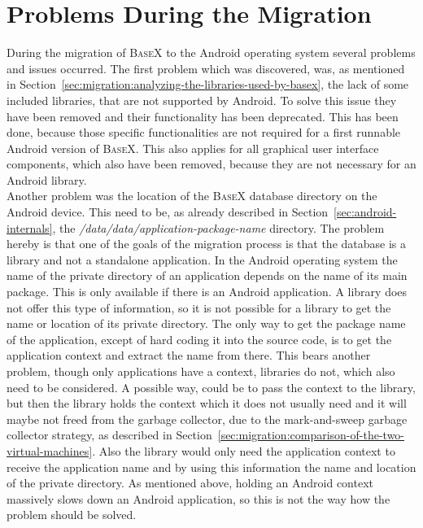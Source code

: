 \section{Problems During the Migration}
\label{sec:migration:problems-during-the-migration}
During the migration of \textsc{BaseX} to the Android operating system several problems and issues occurred.
The first problem which was discovered, was, as mentioned in Section~\ref{sec:migration:analyzing-the-libraries-used-by-basex}, the lack of some included libraries, that are not supported by Android.
To solve this issue they have been removed and their functionality has been deprecated.
This has been done, because those specific functionalities are not required for a first runnable Android version of \textsc{BaseX}. 
This also applies for all graphical user interface components, which also have been removed, because they are not necessary for an Android library.\\
Another problem was the location of the \textsc{BaseX} database directory on the Android device.
This need to be, as already described in Section~\ref{sec:android-internals}, the \textit{/data/data/app\-lication-package-name} directory.
The problem hereby is that one of the goals of the migration process is that the database is a library and not a standalone application.
In the Android operating system the name of the private directory of an application depends on the name of its main package.
This is only available if there is an Android application. 
A library does not offer this type of information, so it is not possible for a library to get the name or location of its private directory.
The only way to get the package name of the application, except of hard coding it into the source code, is to get the application context and extract the name from there.
This bears another problem, though only applications have a context, libraries do not, which also need to be considered. 
A possible way, could be to pass the context to the library, but then the library holds the context which it does not usually need and it will maybe not freed from the garbage collector, due to the mark-and-sweep garbage collector strategy, as described in Section~\ref{sec:migration:comparison-of-the-two-virtual-machines}.
Also the library would only need the application context to receive the application name and by using this information the name and location of the private directory.
As mentioned above, holding an Android context massively slows down an Android application, so this is not the way how the problem should be solved.
